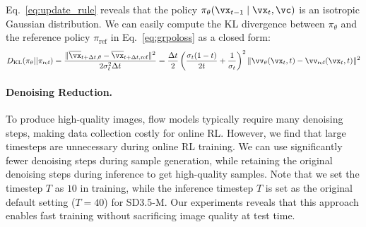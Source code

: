 Eq.~\ref{eq:update_rule} reveals that the policy \(\pi_{\theta}(\vx_{t-1} \mid \vx_t, \vc)\) is an isotropic Gaussian distribution. We can easily compute the KL divergence between $\pi_\theta$ and the reference policy $\pi_{\text{ref}}$ in Eq.~\ref{eq:grpoloss} as a closed form: 
\begin{equation*}
    D_{\text{KL}}(\pi_{\theta} || \pi_{\text{ref}}) = \frac{\|\overline{\vx}_{t+\Delta t, \theta}-\overline{\vx}_{t+\Delta t, \text{ref}}\|^2}{2\sigma_t^2\Delta t}=\frac{\Delta t}{2} \left(\frac{\sigma_t(1-t)}{2t}+\frac{1}{\sigma_t}\right)^2\|\vv_{\theta}(\vx_t,t)-\vv_{\text{ref}}(\vx_t,t)\|^2
    \label{eq:gaussian_kl}
\end{equation*}


\paragraph{Denoising Reduction.}\label{subsec:fastdenoise} To produce high-quality images, flow models typically require many denoising steps, making data collection costly for online RL. However, we find that large timesteps are unnecessary during online RL training. 
We can use significantly fewer denoising
steps during sample generation, while retaining the original denoising steps during inference to get high-quality samples. 
Note that we set the timestep $T$ as $10$  in training, while the inference timestep $T$  is set as the original default setting ($T=40$) for SD3.5-M. Our experiments reveals that this approach enables fast training without sacrificing image quality at test time.



